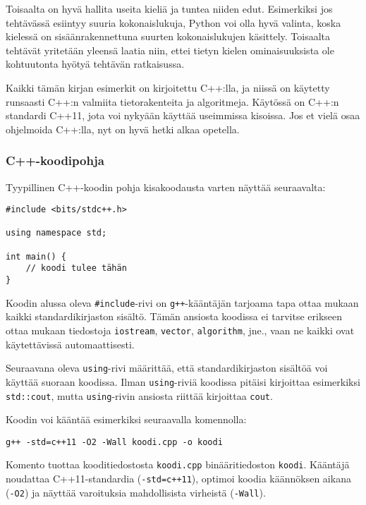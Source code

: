 Toisaalta on hyvä hallita useita kieliä
ja tuntea niiden edut.
Esimerkiksi jos tehtävässä esiintyy
suuria kokonaislukuja,
Python voi olla hyvä valinta,
koska kielessä on sisäänrakennettuna
suurten kokonaislukujen käsittely.
Toisaalta tehtävät yritetään yleensä laatia niin,
ettei tietyn kielen ominaisuuksista
ole kohtuutonta hyötyä tehtävän ratkaisussa.

Kaikki tämän kirjan esimerkit on kirjoitettu C++:lla,
ja niissä on käytetty runsaasti C++:n valmiita 
tietorakenteita ja algoritmeja.
Käytössä on C++:n standardi C++11,
jota voi nykyään käyttää useimmissa kisoissa.
Jos et vielä osaa ohjelmoida C++:lla,
nyt on hyvä hetki alkaa opetella.

\subsubsection{C++-koodipohja}

Tyypillinen C++-koodin pohja kisakoodausta varten
näyttää seuraavalta:

\begin{lstlisting}
#include <bits/stdc++.h>

using namespace std;

int main() {
    // koodi tulee tähän
}
\end{lstlisting}

\noindent
Koodin alussa oleva \texttt{\#include}-rivi
on \texttt{g++}-kääntäjän tarjoama tapa
ottaa mukaan kaikki standardikirjaston sisältö.
Tämän ansiosta koodissa ei tarvitse erikseen
ottaa mukaan tiedostoja \texttt{iostream},
\texttt{vector}, \texttt{algorithm}, jne.,
vaan ne kaikki ovat käytettävissä automaattisesti.

Seuraavana oleva \texttt{using}-rivi määrittää,
että standardikirjaston sisältöä voi käyttää
suoraan koodissa.
Ilman \texttt{using}-riviä koodissa pitäisi
kirjoittaa esimerkiksi \texttt{std::cout},
mutta \texttt{using}-rivin ansiosta riittää
kirjoittaa \texttt{cout}.

Koodin voi kääntää esimerkiksi
seuraavalla komennolla:

\begin{lstlisting}
g++ -std=c++11 -O2 -Wall koodi.cpp -o koodi
\end{lstlisting}

Komento tuottaa kooditiedostosta \texttt{koodi.cpp}
binääritiedoston \texttt{koodi}.
Kääntäjä noudattaa C++11-standardia
(\texttt{-std=c++11}),
optimoi koodia käännöksen aikana (\texttt{-O2})
ja näyttää varoituksia
mahdollisista virheistä (\texttt{-Wall}).

